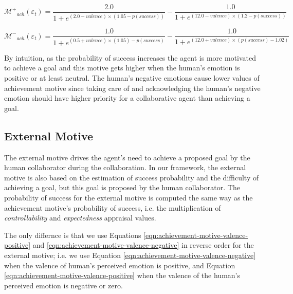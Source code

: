 \documentclass[12pt]{report}
\begin{document}
\begin{equation}
\mathcal{M^{+}}_{ach}(\varepsilon_t)=
\frac{2.0}{1+e^{(2.0-valence)\times(1.05-p(success))}}
- \frac{1.0}{1+e^{(12.0-valence)\times(1.2-p(success))}}
\label{eqn:achievement-motive-valence-positive}
\end{equation}

\begin{equation}
\mathcal{M^{-}}_{ach}(\varepsilon_t)=
\frac{1.0}{1+e^{(0.5+valence)\times(1.05)-p(success)}}
- \frac{1.0}{1+e^{(12.0+valence)\times(p(success)-1.02)}}
\label{eqn:achievement-motive-valence-negative}
\end{equation}

By intuition, as the probability of success increases the agent is more
motivated to achieve a goal and this motive gets higher when the human's
emotion is positive or at least neutral. The human's negative emotions cause
lower values of achievement motive since taking care of and acknowledging the
human's negative emotion should have higher priority for a collaborative agent
than achieving a goal.

\subsection{External Motive}
The external motive drives the agent's need to achieve a proposed goal by the
human collaborator during the collaboration. In our framework, the external
motive is also based on the estimation of success probability and the difficulty
of achieving a goal, but this goal is proposed by the human collaborator. The
probability of success for the external motive is computed the same way as the
achievement motive's probability of success, i.e. the multiplication of
\textit{controllability} and \textit{expectedness} appraisal values.

The only differnce is that we use Equations
\ref{eqn:achievement-motive-valence-positive} and
\ref{eqn:achievement-motive-valence-negative} in reverse order for the external
motive; i.e. we use Equation \ref{eqn:achievement-motive-valence-negative}
when the valence of human's perceived emotion is positive, and Equation
\ref{eqn:achievement-motive-valence-positive} when the valence of the human's
perceived emotion is negative or zero.
\end{document}
